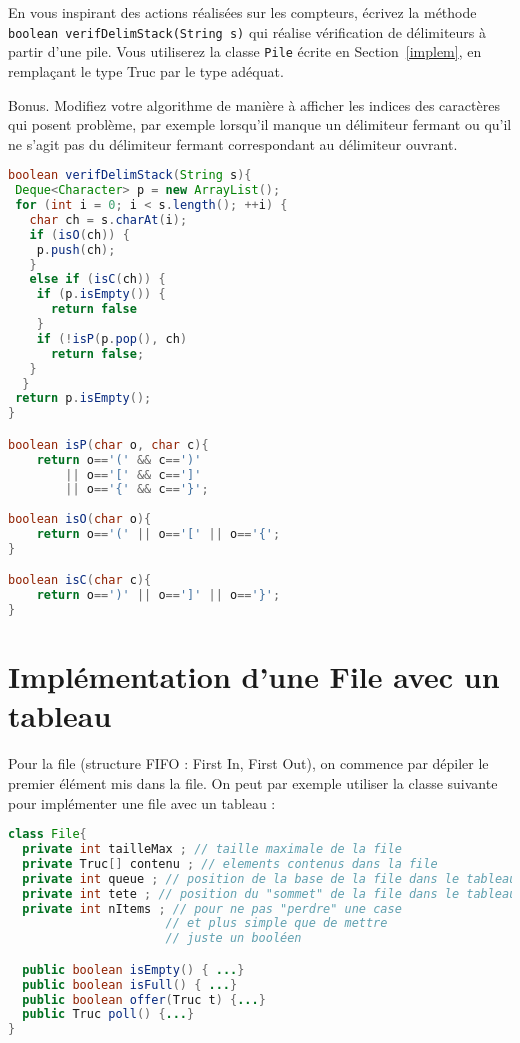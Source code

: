 \documentclass[iutinfo,a4paper,nocorrections,10pt]{ustl-tdtp}
\begin{document}
\question En vous inspirant des actions réalisées sur les compteurs, écrivez la méthode \texttt{boolean verifDelimStack(String s)} qui réalise vérification de délimiteurs à partir d'une pile. Vous utiliserez la classe \texttt{Pile} écrite en Section~\ref{implem}, en remplaçant le type Truc par le type adéquat.

\question Bonus. Modifiez votre algorithme de manière à afficher les indices des caractères qui posent problème, par exemple lorsqu'il manque un délimiteur fermant ou qu'il ne s'agit pas du délimiteur fermant correspondant au délimiteur ouvrant.

\begin{correction}
{\color{red}

\begin{lstlisting}[language=Java]
boolean verifDelimStack(String s){
 Deque<Character> p = new ArrayList(); 
 for (int i = 0; i < s.length(); ++i) {
   char ch = s.charAt(i);
   if (isO(ch)) {
    p.push(ch);
   }
   else if (isC(ch)) {
    if (p.isEmpty()) {
      return false
    }
    if (!isP(p.pop(), ch)
      return false;
   }
  }
 return p.isEmpty();
}

boolean isP(char o, char c){
    return o=='(' && c==')'
        || o=='[' && c==']'
        || o=='{' && c=='}';
        
boolean isO(char o){
    return o=='(' || o=='[' || o=='{';
}

boolean isC(char c){
    return o==')' || o==']' || o=='}';
}


\end{lstlisting}

}
\end{correction}

\section{Implémentation d'une File avec un tableau} 

Pour la file (structure FIFO : First In, First Out), on commence par dépiler le premier élément mis dans la file. On peut
par exemple utiliser la classe suivante pour implémenter une file avec un tableau :


\begin{lstlisting}[language=Java]
class File{
  private int tailleMax ; // taille maximale de la file
  private Truc[] contenu ; // elements contenus dans la file
  private int queue ; // position de la base de la file dans le tableau
  private int tete ; // position du "sommet" de la file dans le tableau
  private int nItems ; // pour ne pas "perdre" une case
                      // et plus simple que de mettre 
                      // juste un booléen

  public boolean isEmpty() { ...}
  public boolean isFull() { ...}
  public boolean offer(Truc t) {...}
  public Truc poll() {...}
}

\end{lstlisting}
\end{document}
